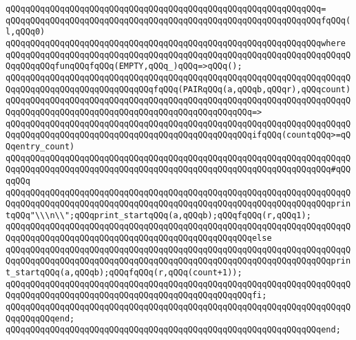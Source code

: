 \verb|qQQqqQQqqQQqqQQqqQQqqQQqqQQqqQQqqQQqqQQqqQQqqQQqqQQqqQQqqQQqqQQq=|\newline
\verb|qQQqqQQqqQQqqQQqqQQqqQQqqQQqqQQqqQQqqQQqqQQqqQQqqQQqqQQqqQQqqQQqfqQQq(l,qQQq0)|\newline
\verb|qQQqqQQqqQQqqQQqqQQqqQQqqQQqqQQqqQQqqQQqqQQqqQQqqQQqqQQqqQQqqQQqwhere|\newline
\verb|qQQqqQQqqQQqqQQqqQQqqQQqqQQqqQQqqQQqqQQqqQQqqQQqqQQqqQQqqQQqqQQqqQQqqQQqqQQqqQQqfunqQQqfqQQq(EMPTY,qQQq_)qQQq=>qQQq();|\newline
\newline
\verb|qQQqqQQqqQQqqQQqqQQqqQQqqQQqqQQqqQQqqQQqqQQqqQQqqQQqqQQqqQQqqQQqqQQqqQQqqQQqqQQqqQQqqQQqqQQqqQQqqQQqfqQQq(PAIRqQQq(a,qQQqb,qQQqr),qQQqcount)|\newline
\verb|qQQqqQQqqQQqqQQqqQQqqQQqqQQqqQQqqQQqqQQqqQQqqQQqqQQqqQQqqQQqqQQqqQQqqQQqqQQqqQQqqQQqqQQqqQQqqQQqqQQqqQQqqQQqqQQqqQQqqQQq=>|\newline
\verb|qQQqqQQqqQQqqQQqqQQqqQQqqQQqqQQqqQQqqQQqqQQqqQQqqQQqqQQqqQQqqQQqqQQqqQQqqQQqqQQqqQQqqQQqqQQqqQQqqQQqqQQqqQQqqQQqqQQqqQQqifqQQq(countqQQq>=qQQqentry_count)|\newline
\verb|qQQqqQQqqQQqqQQqqQQqqQQqqQQqqQQqqQQqqQQqqQQqqQQqqQQqqQQqqQQqqQQqqQQqqQQqqQQqqQQqqQQqqQQqqQQqqQQqqQQqqQQqqQQqqQQqqQQqqQQqqQQqqQQqqQQqqQQq#qQQqqQQq|\newline
\verb|qQQqqQQqqQQqqQQqqQQqqQQqqQQqqQQqqQQqqQQqqQQqqQQqqQQqqQQqqQQqqQQqqQQqqQQqqQQqqQQqqQQqqQQqqQQqqQQqqQQqqQQqqQQqqQQqqQQqqQQqqQQqqQQqqQQqqQQqprintqQQq"\\\n\\";qQQqprint_startqQQq(a,qQQqb);qQQqfqQQq(r,qQQq1);|\newline
\verb|qQQqqQQqqQQqqQQqqQQqqQQqqQQqqQQqqQQqqQQqqQQqqQQqqQQqqQQqqQQqqQQqqQQqqQQqqQQqqQQqqQQqqQQqqQQqqQQqqQQqqQQqqQQqqQQqqQQqqQQqelse|\newline
\verb|qQQqqQQqqQQqqQQqqQQqqQQqqQQqqQQqqQQqqQQqqQQqqQQqqQQqqQQqqQQqqQQqqQQqqQQqqQQqqQQqqQQqqQQqqQQqqQQqqQQqqQQqqQQqqQQqqQQqqQQqqQQqqQQqqQQqqQQqprint_startqQQq(a,qQQqb);qQQqfqQQq(r,qQQq(count+1));|\newline
\verb|qQQqqQQqqQQqqQQqqQQqqQQqqQQqqQQqqQQqqQQqqQQqqQQqqQQqqQQqqQQqqQQqqQQqqQQqqQQqqQQqqQQqqQQqqQQqqQQqqQQqqQQqqQQqqQQqqQQqqQQqfi;|\newline
\verb|qQQqqQQqqQQqqQQqqQQqqQQqqQQqqQQqqQQqqQQqqQQqqQQqqQQqqQQqqQQqqQQqqQQqqQQqqQQqqQQqend;|\newline
\verb|qQQqqQQqqQQqqQQqqQQqqQQqqQQqqQQqqQQqqQQqqQQqqQQqqQQqqQQqqQQqqQQqend;|\newline
\newline
